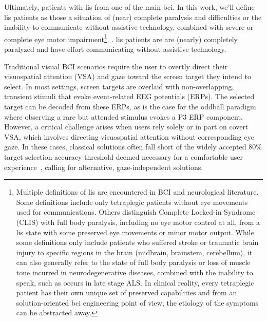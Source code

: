 \newcommand\fnlis{\footnote{
Multiple definitions of \ac{lis} are encountered in
BCI and neurological literature.
Some definitions include only tetraplegic patients without eye movements used
for communications.
Others distinguish Complete Locked-in Syndrome (CLIS) with full body paralysis,
including no eye motor control at all, from a \ac{lis} state with some preserved eye
movements or minor motor output.
While some definitions only include patients who suffered stroke or traumatic
brain injury to specific regions in the brain (midbrain, brainstem,
cerebellum),
it can also generally refer to the state of full body paralysis
or loss of muscle tone incurred in neurodegenerative diseases, combined with
the inability to speak, such as occurs in late stage ALS.
In clinical reality, every tetraplegic patient has their own unique set of
preserved capabilities and from an solution-oriented \ac{bci} engineering point
of view, the etiology of the symptoms can be abstracted away.
}}


Ultimately, patients with \ac{lis} from one of the main
\ac{bci}.
In this work, we'll define \ac{lis} patients as those a situation of (near)
complete paralysis and difficulties or the inability to communicate without
assistive technology, combined with severe or complete eye motor
impairment\fnlis.
.
\Ac{lis} patients are are (nearly) completely paralyzed and have
effort communicating without assistive technology.

Traditional visual BCI scenarios require the user to overtly direct their
visuospatial attention (VSA) and gaze toward the screen target they intend to select.
In most settings, screen targets are overlaid with non-overlapping, transient
stimuli that evoke event-related EEG potentials (ERPs).
The selected target can be decoded from these ERPs, as is the case for the
oddball paradigm where observing a rare but attended stimulus evokes a P3 ERP
component.
However, a critical challenge arises when users rely solely or in part on covert
VSA, which involves directing visuospatial attention without corresponding eye gaze.
In these cases, classical solutions often fall short of the widely accepted
80\% target selection accuracy threshold deemed necessary for a comfortable user
experience~\cite{Brunner2010,Frenzel2011,Treder2010,Ron2019,Neeling2019},
calling for alternative, gaze-independent solutions.

